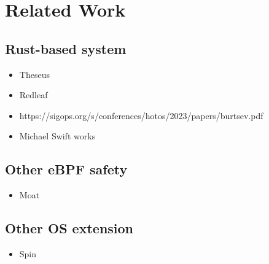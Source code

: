 \section{Related Work}
\subsection{Rust-based system}
\begin{itemize}
    \item Theseus
    \item Redleaf
    \item https://sigops.org/s/conferences/hotos/2023/papers/burtsev.pdf
    \item Michael Swift works
\end{itemize}

\subsection{Other eBPF safety}
\begin{itemize}
    \item Moat
\end{itemize}

\subsection{Other OS extension}
\begin{itemize}
    \item Spin
\end{itemize}
